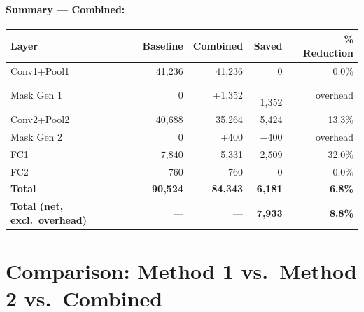 \documentclass[11pt,a4paper]{article}
\begin{document}
\paragraph{Summary — Combined:}
\begin{center}
\begin{tabular}{lrrrr}
\toprule
\textbf{Layer} & \textbf{Baseline} & \textbf{Combined} & \textbf{Saved} & \textbf{\% Reduction} \\
\midrule
Conv1+Pool1 & 41,236 & 41,236 & 0 & 0.0\% \\
Mask Gen 1  & 0      & +1,352 & $-$1,352 & overhead \\
Conv2+Pool2 & 40,688 & 35,264 & 5,424 & 13.3\% \\
Mask Gen 2  & 0      & +400   & $-$400 & overhead \\
FC1         & 7,840  & 5,331  & 2,509 & 32.0\% \\
FC2         & 760    & 760    & 0 & 0.0\% \\
\midrule
\textbf{Total} & \textbf{90,524} & \textbf{84,343} & \textbf{6,181} & \textbf{6.8\%} \\
\textbf{Total (net, excl.\ overhead)} & — & — & \textbf{7,933} & \textbf{8.8\%} \\
\bottomrule
\end{tabular}
\end{center}

\section{Comparison: Method 1 vs.\ Method 2 vs.\ Combined}
\label{sec:comparison}
\end{document}
